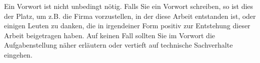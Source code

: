 \preface

Ein Vorwort ist nicht unbedingt nötig. Falls Sie ein Vorwort schreiben, so ist dies der Platz, um z.B. die Firma vorzustellen, in der diese Arbeit entstanden ist, oder einigen Leuten zu danken, die in irgendeiner Form positiv zur Entstehung dieser Arbeit beigetragen haben. Auf keinen Fall sollten Sie im Vorwort die Aufgabenstellung näher erläutern oder vertieft auf technische Sachverhalte eingehen.
